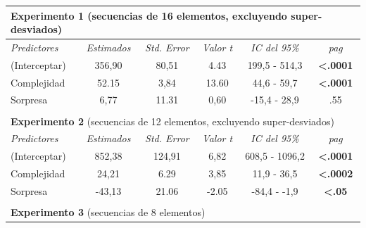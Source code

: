 \begin{table}[]
\centering
\begin{tabular}{lccccc}
\multicolumn{6}{l}{\textbf{Experimento 1} (secuencias de 16 elementos, excluyendo super-desviados)}                                                    \\ \hline
\textit{Predictores}          & \textit{Estimados}   & \textit{Std. Error}  & \textit{Valor t}     & \textit{IC del 95\%} & \textit{pag}              \\ \hline
(Interceptar)                 & 356,90               & 80,51                & 4.43                 & 199,5 - 514,3        & \textbf{\textless{}.0001} \\
Complejidad                   & 52.15                & 3,84                 & 13.60                & 44,6 - 59,7          & \textbf{\textless{}.0001} \\
Sorpresa                      & 6,77                 & 11.31                & 0,60                 & -15,4 - 28,9         & .55                       \\ \hline
\multicolumn{1}{c}{}          & \multicolumn{1}{l}{} &                      &                      &                      &                           \\
\multicolumn{6}{l}{\textbf{Experimento 2} (secuencias de 12 elementos, excluyendo super-desviados)}                                                    \\ \hline
\textit{Predictores}          & \textit{Estimados}   & \textit{Std. Error}  & \textit{Valor t}     & \textit{IC del 95\%} & \textit{pag}              \\ \hline
(Interceptar)                 & 852,38               & 124,91               & 6,82                 & 608,5 - 1096,2       & \textbf{\textless{}.0001} \\
Complejidad                   & 24,21                & 6.29                 & 3,85                 & 11,9 - 36,5          & \textbf{\textless{}.0002} \\
Sorpresa                      & -43,13               & 21.06                & -2.05                & -84,4 - -1,9         & \textbf{\textless{}.05}   \\ \hline
\textbf{}                     & \multicolumn{1}{l}{} & \multicolumn{1}{l}{} & \multicolumn{1}{l}{} & \multicolumn{1}{l}{} & \multicolumn{1}{l}{}      \\
\multicolumn{6}{l}{\textbf{Experimento 3} (secuencias de 8 elementos)}                                                                                \\ \hline

\end{tabular}
\end{table}
